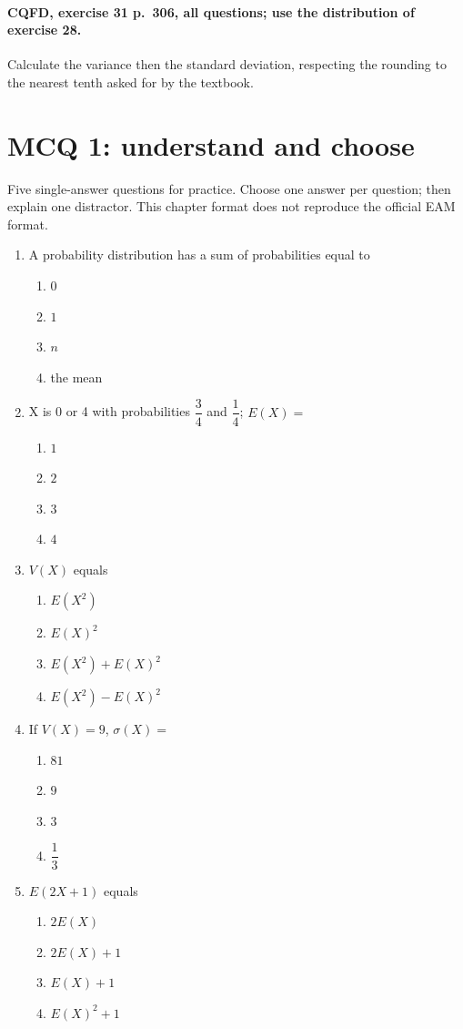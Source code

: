 \paragraph{CQFD, exercise 31 p.~306, all questions; use the distribution of exercise 28.}\label{C08-M2} Calculate the variance then the standard deviation, respecting the rounding to the nearest tenth asked for by the textbook.
\begingroup\small
\mxnewpage\section*{MCQ 1: understand and choose}\label{C08-Q1}
Five single-answer questions for practice. Choose one answer per question; then explain one distractor. This chapter format does not reproduce the official EAM format.
\begin{enumerate}
\item A probability distribution has a sum of probabilities equal to
\begin{enumerate}[label=\Alph*.,itemsep=2pt]
\item $0$
\item $1$
\item $n$
\item the mean
\end{enumerate}
\item X is 0 or 4 with probabilities $\dfrac{3}{4}$ and $\dfrac{1}{4}$; $E(X)=$
\begin{enumerate}[label=\Alph*.,itemsep=2pt]
\item $1$
\item $2$
\item $3$
\item $4$
\end{enumerate}
\item $V(X)$ equals
\begin{enumerate}[label=\Alph*.,itemsep=2pt]
\item $E(X^2)$
\item $E(X)^2$
\item $E(X^2)+E(X)^2$
\item $E(X^2)-E(X)^2$
\end{enumerate}
\item If $V(X)=9$, $\sigma(X)=$
\begin{enumerate}[label=\Alph*.,itemsep=2pt]
\item $81$
\item $9$
\item $3$
\item $\dfrac{1}{3}$
\end{enumerate}
\item $E(2X+1)$ equals
\begin{enumerate}[label=\Alph*.,itemsep=2pt]
\item $2E(X)$
\item $2E(X)+1$
\item $E(X)+1$
\item $E(X)^2+1$
\end{enumerate}
\end{enumerate}
